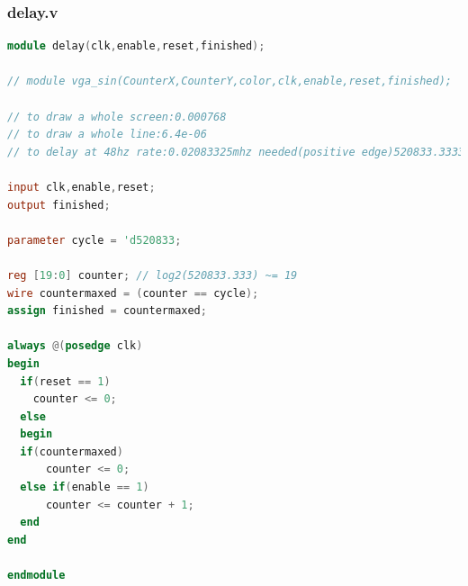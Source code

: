 \documentclass[11pt]{scrartcl}
\begin{document}
\subsubsection{delay.v}
\begin{lstlisting}[language=Verilog]
module delay(clk,enable,reset,finished);

// module vga_sin(CounterX,CounterY,color,clk,enable,reset,finished);

// to draw a whole screen:0.000768
// to draw a whole line:6.4e-06
// to delay at 48hz rate:0.02083325mhz needed(positive edge)520833.3333

input clk,enable,reset;
output finished;

parameter cycle = 'd520833;

reg [19:0] counter; // log2(520833.333) ~= 19
wire countermaxed = (counter == cycle);
assign finished = countermaxed;

always @(posedge clk)
begin
  if(reset == 1)
    counter <= 0;
  else
  begin
  if(countermaxed)
      counter <= 0;
  else if(enable == 1)
      counter <= counter + 1;
  end
end

endmodule
\end{lstlisting}
\end{document}
